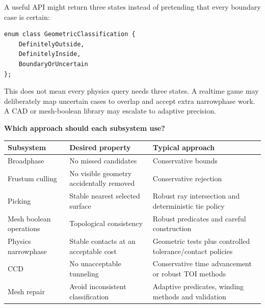 A useful API might return three states instead of pretending that every boundary case is certain:

\begin{verbatim}
enum class GeometricClassification {
    DefinitelyOutside,
    DefinitelyInside,
    BoundaryOrUncertain
};
\end{verbatim}

This does not mean every physics query needs three states. A realtime game may deliberately map uncertain cases to overlap and accept extra narrowphase work. A CAD or mesh-boolean library may escalate to adaptive precision.

\textbf{Which approach should each subsystem use?}

{\def\LTcaptype{none} %
\begin{longtable}[]{@{}
  >{\raggedright\arraybackslash}p{}
  >{\raggedright\arraybackslash}p{}
  >{\raggedright\arraybackslash}p{}@{}}
\toprule\noalign{}
\begin{minipage}[b]{\linewidth}\raggedright
Subsystem
\end{minipage} & \begin{minipage}[b]{\linewidth}\raggedright
Desired property
\end{minipage} & \begin{minipage}[b]{\linewidth}\raggedright
Typical approach
\end{minipage} \\
\midrule\noalign{}
\endhead
\bottomrule\noalign{}
\endlastfoot
Broadphase & No missed candidates & Conservative bounds \\
Frustum culling & No visible geometry accidentally removed & Conservative rejection \\
Picking & Stable nearest selected surface & Robust ray intersection and deterministic tie policy \\
Mesh boolean operations & Topological consistency & Robust predicates and careful construction \\
Physics narrowphase & Stable contacts at an acceptable cost & Geometric tests plus controlled tolerance/contact policies \\
CCD & No unacceptable tunneling & Conservative time advancement or robust TOI methods \\
Mesh repair & Avoid inconsistent classification & Adaptive predicates, winding methods and validation \\
\end{longtable}
}

